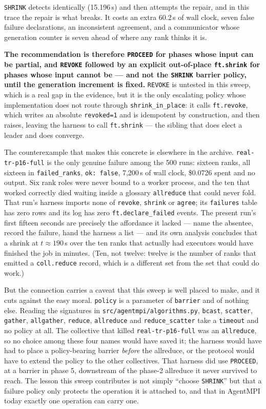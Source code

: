 \documentclass[11pt]{article}
\begin{document}
\texttt{SHRINK} detects identically (15.196\,s) and then attempts the repair, and in this
trace the repair is what breaks. It costs an extra 60.2\,s of wall clock, seven false
failure declarations, an inconsistent agreement, and a communicator whose generation
counter is seven ahead of where any rank thinks it is.

\textbf{The recommendation is therefore \texttt{PROCEED} for phases whose input can be
partial, and \texttt{REVOKE} followed by an explicit out-of-place \texttt{ft.shrink} for
phases whose input cannot be --- and not the \texttt{SHRINK} barrier policy, until the
generation increment is fixed.} \texttt{REVOKE} is untested in this sweep, which is a
real gap in the evidence, but it is the only escalating policy whose implementation does
not route through \texttt{shrink\_in\_place}: it calls \texttt{ft.revoke}, which writes
an absolute \texttt{revoked=1} and is idempotent by construction, and then raises, leaving
the harness to call \texttt{ft.shrink} --- the sibling that does elect a leader and does
converge.

The counterexample that makes this concrete is elsewhere in the archive.
\texttt{real-tr-p16-full} is the only genuine failure among the 500 runs: sixteen ranks,
all sixteen in \texttt{failed\_ranks}, \texttt{ok: false}, 7{,}200\,s of wall clock,
\$0.0726 spent and no output. Six rank roles were never bound to a worker process, and the
ten that worked correctly died waiting inside a glossary \texttt{allreduce} that could
never fold. That run's harness imports none of \texttt{revoke}, \texttt{shrink} or
\texttt{agree}; its \texttt{failures} table has zero rows and its log has zero
\texttt{ft.declare\_failed} events. The present run's first fifteen seconds are precisely
the affordance it lacked --- name the absentee, record the failure, hand the harness a
list --- and its own analysis concludes that a shrink at $t\approx190$\,s over the ten
ranks that actually had executors would have finished the job in minutes. (Ten, not
twelve: twelve is the number of ranks that emitted a \texttt{coll.reduce} record, which is
a different set from the set that could do work.)

But the connection carries a caveat that this sweep is well placed to make, and it cuts
against the easy moral. \texttt{policy} is a parameter of \texttt{barrier} and of nothing
else. Reading the signatures in \texttt{src/agentmpi/algorithms.py}, \texttt{bcast},
\texttt{scatter}, \texttt{gather}, \texttt{allgather}, \texttt{reduce},
\texttt{allreduce} and \texttt{reduce\_scatter} take a \texttt{timeout} and no policy at
all. The collective that killed \texttt{real-tr-p16-full} was an \texttt{allreduce}, so
no choice among these four names would have saved it; the harness would have had to place
a policy-bearing barrier \emph{before} the allreduce, or the protocol would have to
extend the policy to the other collectives. That harness did use \texttt{PROCEED}, at a
barrier in phase 5, downstream of the phase-2 allreduce it never survived to reach. The
lesson this sweep contributes is not simply ``choose \texttt{SHRINK}'' but that a failure
policy only protects the operation it is attached to, and that in AgentMPI today exactly
one operation can carry one.
\end{document}

